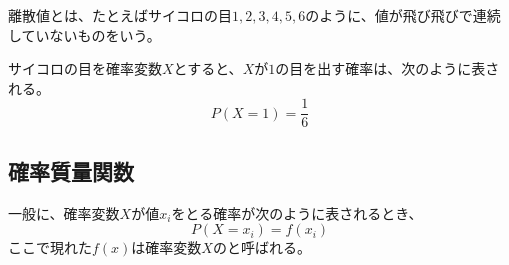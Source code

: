 \documentclass[../../../topic_statistics]{subfiles}
\begin{document}
離散値とは、たとえばサイコロの目$1, 2, 3, 4, 5, 6$のように、値が飛び飛びで連続していないものをいう。

\br

サイコロの目を確率変数$X$とすると、$X$が$1$の目を出す確率は、次のように表される。
\begin{equation*}
  P(X = 1) = \frac{1}{6}
\end{equation*}

\subsection{確率質量関数}

一般に、確率変数$X$が値$x_i$をとる確率が次のように表されるとき、
\begin{equation*}
  P(X = x_i) = f(x_i)
\end{equation*}
ここで現れた$f(x)$は確率変数$X$のと呼ばれる。
\end{document}
